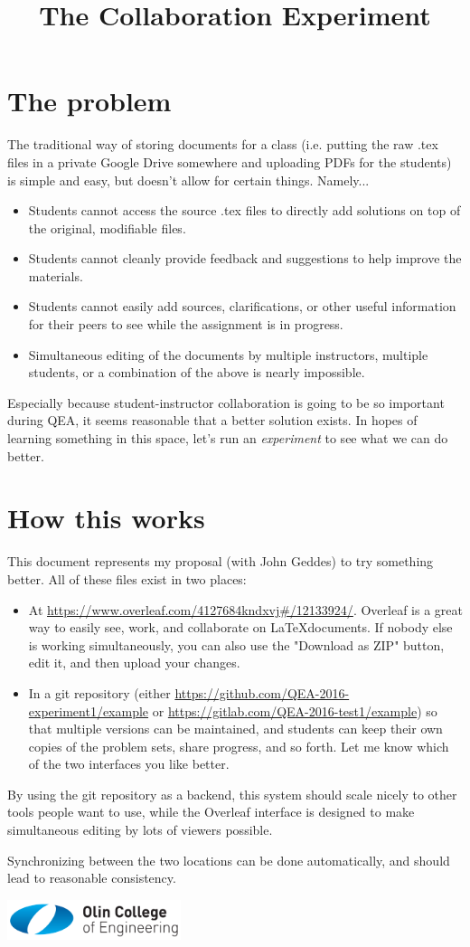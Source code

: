 \documentclass{article}
\title{The Collaboration Experiment}
\begin{document}
\maketitle
\large
\section{The problem}
The traditional way of storing documents for a class (i.e. putting the raw .tex files in a private Google Drive somewhere and uploading PDFs for the students) is simple and easy, but doesn't allow for certain things. Namely...
\begin{itemize}
\item Students cannot access the source .tex files to directly add solutions on top of the original, modifiable files.
\item Students cannot cleanly provide feedback and suggestions to help improve the materials.
\item Students cannot easily add sources, clarifications, or other useful information for their peers to see while the assignment is in progress.
\item Simultaneous editing of the documents by multiple instructors, multiple students, or a combination of the above is nearly impossible.
\end{itemize}

Especially because student-instructor collaboration is going to be so important during QEA, it seems reasonable that a better solution exists. In hopes of learning something in this space, let's run an \textit{experiment} to see what we can do better.

\section{How this works}
This document represents my  proposal (with John Geddes) to try something better. All of these files exist in two places:
\begin{itemize}
\item At \url{https://www.overleaf.com/4127684kndxvj#/12133924/}. Overleaf is a great way to easily see, work, and collaborate on \LaTeX documents. If nobody else is working simultaneously, you can also use the "Download as ZIP" button, edit it, and then upload your changes.
\item In a git repository (either \url{https://github.com/QEA-2016-experiment1/example} or \url{https://gitlab.com/QEA-2016-test1/example}) so that multiple versions can be maintained, and students can keep their own copies of the problem sets, share progress, and so forth. Let me know which of the two interfaces you like better.
%
%
\end{itemize}
By using the git repository as a backend, this system should scale nicely to other tools people want to use, while the Overleaf interface is designed to make simultaneous editing by lots of viewers possible.

Synchronizing between the two locations can be done automatically, and should lead to reasonable consistency.

\vspace{1in}
\includegraphics[width=2in]{OlinCollege}
\end{document}
